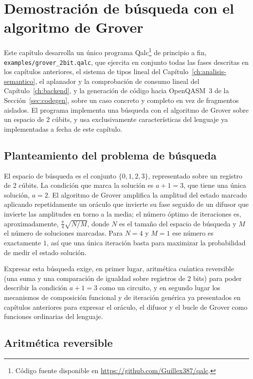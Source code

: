 \chapter{Demostración de búsqueda con el algoritmo de Grover}
\label{ch:demostracion}

Este capítulo desarrolla un único programa Qalc\footnote{Código fuente disponible en \url{https://github.com/Guillex387/qalc}.} de principio a fin, \lstinline|examples/grover_2bit.qalc|, que ejercita en conjunto todas las fases descritas en los capítulos anteriores, el sistema de tipos lineal del Capítulo~\ref{ch:analisis-semantico}, el aplanador y la comprobación de consumo lineal del Capítulo~\ref{ch:backend}, y la generación de código hacia OpenQASM~3 de la Sección~\ref{sec:codegen}, sobre un caso concreto y completo en vez de fragmentos aislados. El programa implementa una búsqueda con el algoritmo de Grover sobre un espacio de 2 cúbits, y usa exclusivamente características del lenguaje ya implementadas a fecha de este capítulo.

\section{Planteamiento del problema de búsqueda}
\label{sec:grover-problema}

El espacio de búsqueda es el conjunto $\{0, 1, 2, 3\}$, representado sobre un registro de 2 cúbits. La condición que marca la solución es $a + 1 = 3$, que tiene una única solución, $a = 2$. El algoritmo de Grover amplifica la amplitud del estado marcado aplicando repetidamente un oráculo que invierte su fase seguido de un difusor que invierte las amplitudes en torno a la media; el número óptimo de iteraciones es, aproximadamente, $\frac{\pi}{4}\sqrt{N/M}$, donde $N$ es el tamaño del espacio de búsqueda y $M$ el número de soluciones marcadas. Para $N = 4$ y $M = 1$ ese número es exactamente $1$, así que una única iteración basta para maximizar la probabilidad de medir el estado solución.

Expresar esta búsqueda exige, en primer lugar, aritmética cuántica reversible (una suma y una comparación de igualdad sobre registros de 2 bits) para poder describir la condición $a + 1 = 3$ como un circuito, y en segundo lugar los mecanismos de composición funcional y de iteración genérica ya presentados en capítulos anteriores para expresar el oráculo, el difusor y el bucle de Grover como funciones ordinarias del lenguaje.

\section{Aritmética reversible}
\label{sec:grover-sumador}

